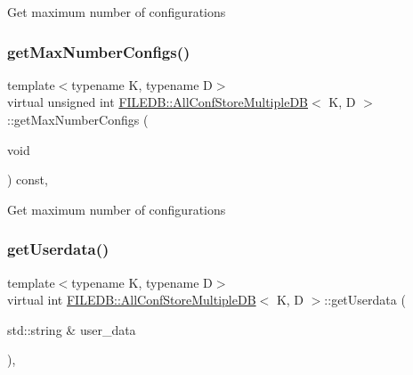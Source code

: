 Get maximum number of configurations \mbox{\label{classFILEDB_1_1AllConfStoreMultipleDB_a9348ec8716b4c716df67dca608bb1bde}} 
\subsubsection{\texorpdfstring{getMaxNumberConfigs()}{getMaxNumberConfigs()}\hspace{0.1cm}{\footnotesize\ttfamily [2/2]}}
{\footnotesize\ttfamily template$<$typename K, typename D$>$ \\
virtual unsigned int \mbox{\hyperlink{classFILEDB_1_1AllConfStoreMultipleDB}{F\+I\+L\+E\+D\+B\+::\+All\+Conf\+Store\+Multiple\+DB}}$<$ K, D $>$\+::get\+Max\+Number\+Configs (\begin{DoxyParamCaption}\item[{void}]{ }\end{DoxyParamCaption}) const\hspace{0.3cm}{\ttfamily [inline]}, {\ttfamily [virtual]}}

Get maximum number of configurations \mbox{\label{classFILEDB_1_1AllConfStoreMultipleDB_a9a314fba1056c35ffe54e35e98e83523}} 
\subsubsection{\texorpdfstring{getUserdata()}{getUserdata()}\hspace{0.1cm}{\footnotesize\ttfamily [1/2]}}
{\footnotesize\ttfamily template$<$typename K, typename D$>$ \\
virtual int \mbox{\hyperlink{classFILEDB_1_1AllConfStoreMultipleDB}{F\+I\+L\+E\+D\+B\+::\+All\+Conf\+Store\+Multiple\+DB}}$<$ K, D $>$\+::get\+Userdata (\begin{DoxyParamCaption}\item[{std\+::string \&}]{user\+\_\+data }\end{DoxyParamCaption})\hspace{0.3cm}{\ttfamily [inline]}, {\ttfamily [virtual]}}

